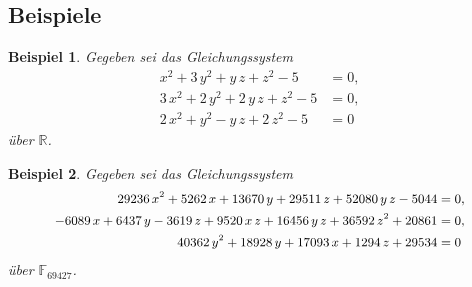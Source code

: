 \documentclass[11pt]{beamer}
\newcommand{\R}{{\mathbb R}}
\newcommand{\F}[1]{\mathbb{F}_{#1}}
\theoremstyle{custom}
\theoremstyle{custom}
\newtheorem{exm}{Beispiel}[section]
\begin{document}
	\subsection*{Beispiele}
	\begin{frame}
		\begin{exm}
			Gegeben sei das Gleichungssystem	
			\begin{equation*}\label{eqn:example5}
				\begin{alignedat}{-1}
					x^2+3\,y^2+y\,z+z^2-5&=0,\\
					3\,x^2+2\,y^2+2\,y\,z+z^2-5&=0,\\
					2\,x^2+y^2-y\,z+2\,z^2-5&=0
				\end{alignedat}
			\end{equation*}
			über $\R$.
		\end{exm}
	\end{frame}
	\begin{frame}
		\begin{exm}
			Gegeben sei das Gleichungssystem
			\begin{equation*}
				\small
				\begin{alignedat}{-1}
					29236\,x^2+5262\,x+13670\,y+29511\,z+52080\,y\,z-5044&=0,\\ -6089\,x+6437\,y-3619\,z+9520\,x\,z+16456\,y\,z+36592\,z^2+20861&=0,\\ 40362\,y^2+18928\,y+17093\,x+1294\,z+29534&=0
				\end{alignedat}
			\end{equation*}
			über $\F{69427}$.
		\end{exm}
	\end{frame}
\end{document}
